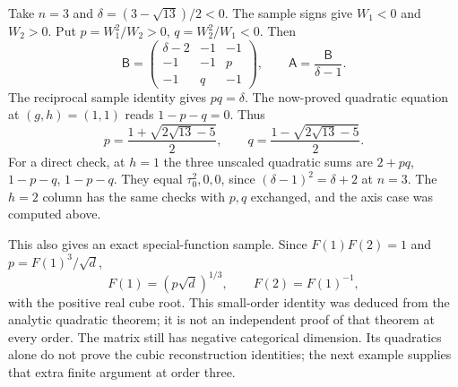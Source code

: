 \begin{example}
Take $n=3$ and $\delta=(3-\sqrt{13})/2<0$. The sample signs
give $W_1<0$ and $W_2>0$. Put
$p=W_1^2/W_2>0$, $q=W_2^2/W_1<0$. Then
\begin{equation}\label{eq:HI-n3-matrix}
 \mathsf B=\begin{pmatrix}
 \delta-2&-1&-1\\-1&-1&p\\-1&q&-1
 \end{pmatrix},\qquad \mathsf A=\frac{\mathsf B}{\delta-1}.
\end{equation}
The reciprocal sample identity gives $pq=\delta$.
The now-proved quadratic equation at $(g,h)=(1,1)$ reads
$1-p-q=0$. Thus
\[
 p=\frac{1+\sqrt{2\sqrt{13}-5}}2,\qquad
 q=\frac{1-\sqrt{2\sqrt{13}-5}}2.
\]
For a direct check, at $h=1$ the three unscaled quadratic sums
are $2+pq$, $1-p-q$, $1-p-q$. They equal
$\tau_0^2,0,0$, since
$(\delta-1)^2=\delta+2$ at $n=3$. The $h=2$ column has
the same checks with $p,q$ exchanged, and the axis case was
computed above.

This also gives an exact special-function sample. Since
$F(1)F(2)=1$ and $p=F(1)^3/\sqrt d$,
\[
 F(1)=(p\sqrt d)^{1/3},\qquad F(2)=F(1)^{-1},
\]
with the positive real cube root. This small-order identity was
deduced from the analytic quadratic theorem; it is not an
independent proof of that theorem at every order. The matrix
still has negative categorical dimension. Its quadratics alone
do not prove the cubic reconstruction identities; the next
example supplies that extra finite argument at order three.
\end{example}

